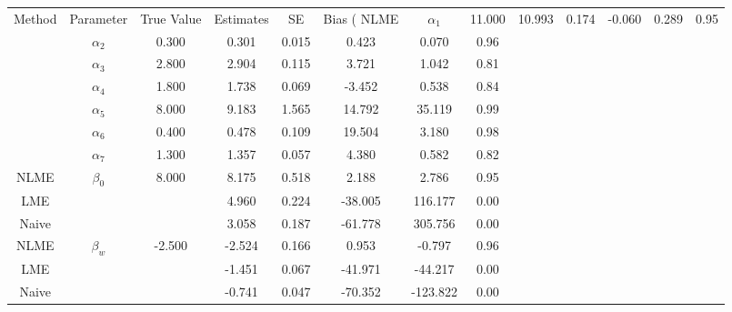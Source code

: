 \begin{table}[ht]
\centering
\begin{tabular}{cccccccc}
  \hline
Method & Parameter & True Value & Estimates & SE & Bias (%
  \hline
NLME & $\alpha_1$ & 11.000 & 10.993 & 0.174 & -0.060 & 0.289 & 0.95 \\ 
   & $\alpha_2$ & 0.300 & 0.301 & 0.015 & 0.423 & 0.070 & 0.96 \\ 
   & $\alpha_3$ & 2.800 & 2.904 & 0.115 & 3.721 & 1.042 & 0.81 \\ 
   & $\alpha_4$ & 1.800 & 1.738 & 0.069 & -3.452 & 0.538 & 0.84 \\ 
   & $\alpha_5$ & 8.000 & 9.183 & 1.565 & 14.792 & 35.119 & 0.99 \\ 
   & $\alpha_6$ & 0.400 & 0.478 & 0.109 & 19.504 & 3.180 & 0.98 \\ 
   & $\alpha_7$ & 1.300 & 1.357 & 0.057 & 4.380 & 0.582 & 0.82 \\ 
   \hline
NLME & $\beta_0$ & 8.000 & 8.175 & 0.518 & 2.188 & 2.786 & 0.95 \\ 
  LME &  &  & 4.960 & 0.224 & -38.005 & 116.177 & 0.00 \\ 
  Naive &  &  & 3.058 & 0.187 & -61.778 & 305.756 & 0.00 \\ 
  NLME & $\beta_w$ & -2.500 & -2.524 & 0.166 & 0.953 & -0.797 & 0.96 \\ 
  LME &  &  & -1.451 & 0.067 & -41.971 & -44.217 & 0.00 \\ 
  Naive &  &  & -0.741 & 0.047 & -70.352 & -123.822 & 0.00 \\ 
  \end{tabular}
\end{table}
